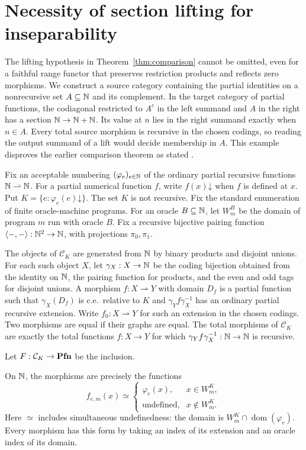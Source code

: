 \section{Necessity of section lifting for inseparability}
\label{app:lifting-counterexample}

The lifting hypothesis in Theorem~\ref{thm:comparison} cannot be
omitted, even for a faithful range functor that preserves restriction
products and reflects zero morphisms. We construct a source category
containing the partial identities on a nonrecursive set $A\subseteq\mathbb N$
and its complement. In the target category of partial functions, the
codiagonal restricted to $A^c$ in the left summand and $A$ in the right
has a section $\mathbb N\to\mathbb N+\mathbb N$. Its value at $n$ lies in the right summand
exactly when $n\in A$. Every total source morphism is recursive in the
chosen codings, so reading the output summand of a lift would decide
membership in $A$. This example disproves the earlier comparison theorem
as stated \cite[Theorem~4.1]{Lengyel2006}.

Fix an acceptable numbering $(\varphi_e)_{e\in\mathbb N}$ of the ordinary
partial recursive functions $\mathbb N\rightharpoonup\mathbb N$. For a partial
numerical function $f$, write $f(x)\mathord\downarrow$ when $f$ is
defined at $x$. Put $K=\{e:\varphi_e(e)\mathord\downarrow\}$.
The set $K$ is not recursive.
Fix the standard enumeration of finite oracle-machine programs. For an
oracle $B\subseteq\mathbb N$, let $W_m^B$ be the domain of program $m$ run with oracle $B$.
Fix a recursive bijective pairing function
$\langle-,-\rangle:\mathbb N^2\to\mathbb N$, with projections $\pi_0,\pi_1$.

The objects of $\mathcal C_K$ are generated from $\mathbb N$ by binary
products and disjoint unions. For each such object $X$, let
$\gamma_X:X\to\mathbb N$ be the coding bijection obtained from the identity
on $\mathbb N$, the pairing function for products, and the even and odd
tags for disjoint unions. A morphism $f:X\rightharpoonup Y$ with domain
$D_f$ is a partial function such that $\gamma_X(D_f)$ is c.e.\ relative
to $K$ and $\gamma_Y f\gamma_X^{-1}$ has an ordinary partial recursive
extension. Write $f_0:X\rightharpoonup Y$ for such an extension in the
chosen codings. Two morphisms are equal if their graphs are equal. The total morphisms of $\mathcal C_K$ are exactly
the total functions $f:X\to Y$ for which
$\gamma_Y f\gamma_X^{-1}:\mathbb N\to\mathbb N$ is recursive.

Let $F:\mathcal C_K\to\mathbf{Pfn}$ be the inclusion.

On $\mathbb N$, the morphisms are precisely the functions
\[
 f_{e,m}(x)\simeq
 \begin{cases}
  \varphi_e(x),&x\in W_m^K,\\
  \text{undefined},&x\notin W_m^K.
 \end{cases}
\]
Here $\simeq$ includes simultaneous undefinedness: the domain
is $W_m^K\cap\operatorname{dom}(\varphi_e)$. Every morphism has this
form by taking an index of its extension and an oracle index of its
domain.

